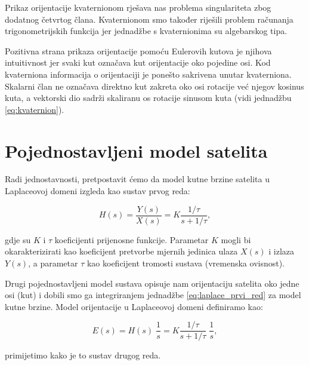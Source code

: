 \documentclass[times, utf8, diplomski, numeric]{templates/template}
\begin{document}
{{        Prikaz orijentacije kvaternionom rješava nas problema singulariteta zbog dodatnog četvrtog člana. Kvaternionom smo također riješili problem računanja trigonometrijskih funkcija jer jednadžbe s kvaternionima su algebarskog tipa.

        Pozitivna strana prikaza orijentacije pomoću Eulerovih kutova je njihova intuitivnost jer svaki kut označava kut orijentacije oko pojedine osi. Kod kvaterniona informacija o orijentaciji je ponešto sakrivena unutar kvaterniona. Skalarni član ne označava direktno kut zakreta oko osi rotacije već njegov kosinus kuta, a vektorski dio sadrži skaliranu os rotacije sinusom kuta (vidi jednadžbu \ref{eq:kvaternion}).
    }

    \section{Pojednostavljeni model satelita}{
        Radi jednostavnosti, pretpostavit ćemo da model kutne brzine satelita u Laplaceovoj domeni izgleda kao sustav prvog reda:
        
        \begin{equation}
        \label{eq:laplace_prvi_red}
        H(s) = \frac{Y(s)}{X(s)} = K \frac{1/\tau}{s + 1/\tau},
        \end{equation}

        gdje su $K$ i $\tau$ koeficijenti prijenosne funkcije. Parametar $K$ mogli bi okarakterizirati kao koeficijent pretvorbe mjernih jedinica ulaza $X(s)$ i izlaza $Y(s)$, a parametar $\tau$ kao koeficijent tromosti sustava (vremenska ovisnost).

        Drugi pojednostavljeni model sustava opisuje nam orijentaciju satelita oko jedne osi (kut) i dobili smo ga integriranjem jednadžbe \ref{eq:laplace_prvi_red} za model kutne brzine. Model orijentacije u Laplaceovoj domeni definiramo kao:

        \begin{equation}
        \label{eq:laplace_drugi_red}
            E(s) = H(s) \; \frac{1}{s} = K \frac{1/\tau}{s + 1/\tau} \; \frac{1}{s},
        \end{equation}

        primijetimo kako je to sustav drugog reda.
    }
}
\end{document}
